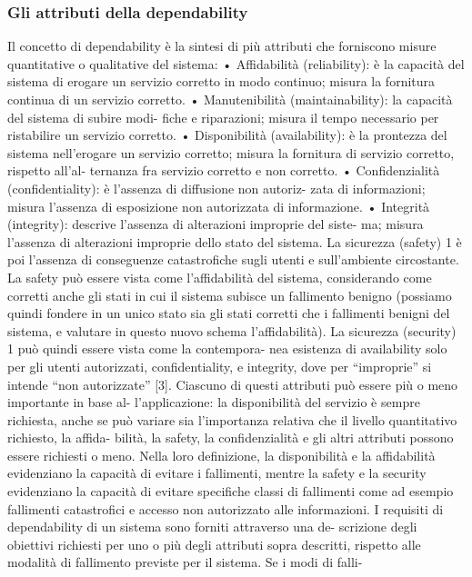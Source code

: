 \documentclass[14pt]{extarticle}
\begin{document}
\subsubsection{Gli attributi della dependability}
Il concetto di dependability è la sintesi di più attributi che forniscono misure
quantitative o qualitative del sistema:
• Affidabilità (reliability): è la capacità del sistema di erogare un servizio
corretto in modo continuo; misura la fornitura continua di un servizio
corretto.
• Manutenibilità (maintainability): la capacità del sistema di subire modi-
fiche e riparazioni; misura il tempo necessario per ristabilire un servizio
corretto.
• Disponibilità (availability): è la prontezza del sistema nell’erogare un
servizio corretto; misura la fornitura di servizio corretto, rispetto all’al-
ternanza fra servizio corretto e non corretto.
• Confidenzialità (confidentiality): è l’assenza di diffusione non autoriz-
zata di informazioni; misura l’assenza di esposizione non autorizzata di
informazione.
• Integrità (integrity): descrive l’assenza di alterazioni improprie del siste-
ma; misura l’assenza di alterazioni improprie dello stato del sistema.
La sicurezza (safety) 1 è poi l’assenza di conseguenze catastrofiche sugli
utenti e sull’ambiente circostante. La safety può essere vista come l’affidabilità
del sistema, considerando come corretti anche gli stati in cui il sistema subisce
un fallimento benigno (possiamo quindi fondere in un unico stato sia gli stati
corretti che i fallimenti benigni del sistema, e valutare in questo nuovo schema
l’affidabilità).
La sicurezza (security) 1 può quindi essere vista come la contempora-
nea esistenza di availability solo per gli utenti autorizzati, confidentiality, e
integrity, dove per “improprie” si intende “non autorizzate” [3].
Ciascuno di questi attributi può essere più o meno importante in base al-
l’applicazione: la disponibilità del servizio è sempre richiesta, anche se può
variare sia l’importanza relativa che il livello quantitativo richiesto, la affida-
bilità, la safety, la confidenzialità e gli altri attributi possono essere richiesti
o meno. Nella loro definizione, la disponibilità e la affidabilità evidenziano la
capacità di evitare i fallimenti, mentre la safety e la security evidenziano la
capacità di evitare specifiche classi di fallimenti come ad esempio fallimenti
catastrofici e accesso non autorizzato alle informazioni.
I requisiti di dependability di un sistema sono forniti attraverso una de-
scrizione degli obiettivi richiesti per uno o più degli attributi sopra descritti,
rispetto alle modalità di fallimento previste per il sistema. Se i modi di falli-
\end{document}
